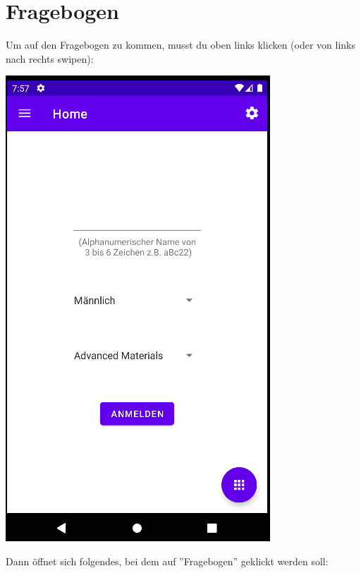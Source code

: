 \documentclass{article}
\begin{document}
\section{Fragebogen}
Um auf den Fragebogen zu kommen, musst du oben links klicken (oder von links nach rechts swipen):
\begin{center}
    \includegraphics[scale=0.45]{start_reg.png}
\end{center}
Dann öffnet sich folgendes, bei dem auf ''Fragebogen'' geklickt werden soll:
\end{document}
